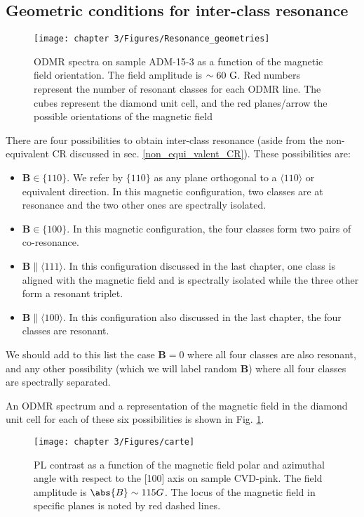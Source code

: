 \documentclass[a4paper, 11pt]{report}
\begin{document}
\subsection{Geometric conditions for inter-class resonance}
\label{sec geometrie resonance}

\begin{figure}[h!]
\centering
\texttt{[image: chapter 3/Figures/Resonance\_geometries]}
\caption{ODMR spectra on sample ADM-15-3 as a function of the magnetic field orientation. The field amplitude is $\sim 60\ \rm G$. Red numbers represent the number of resonant classes for each ODMR line. The cubes represent the diamond unit cell, and the red planes/arrow the possible orientations of the magnetic field}
\label{ODMR_geometries}
\end{figure}

There are four possibilities to obtain inter-class resonance (aside from the non-equivalent CR discussed in sec. \ref{non_equi_valent_CR}). These possibilities are:
\begin{itemize}
\item $\mathbf{B} \in \{110\}$. We refer by $\{110\}$ as any plane orthogonal to a $\langle 110 \rangle$ or equivalent direction. In this magnetic configuration, two classes are at resonance and the two other ones are spectrally isolated.
\item $\mathbf{B} \in \{100\}$. In this magnetic configuration, the four classes form two pairs of co-resonance.
\item $\mathbf{B} \parallel \langle 111 \rangle$. In this configuration discussed in the last chapter, one class is aligned with the magnetic field and is spectrally isolated while the three other form a resonant triplet.
\item $\mathbf{B} \parallel \langle 100 \rangle$. In this configuration also discussed in the last chapter, the four classes are resonant.
\end{itemize}
We should add to this list the case $\mathbf{B}=0$ where all four classes are also resonant, and any other possibility (which we will label random $\mathbf{B}$) where all four classes are spectrally separated. 

An ODMR spectrum and a representation of the magnetic field in the diamond unit cell for each of these six possibilities is shown in Fig. \ref{ODMR_geometries}.

\begin{figure}[h]
\centering
\texttt{[image: chapter 3/Figures/carte]}
\caption{PL contrast as a function of the magnetic field polar and azimuthal angle with respect to the [100] axis on sample CVD-pink. The field amplitude is $\abs{B} \sim 115 G$. The locus of the magnetic field in specific planes is noted by red dashed lines.}
\label{Carte}
\end{figure}
\end{document}
